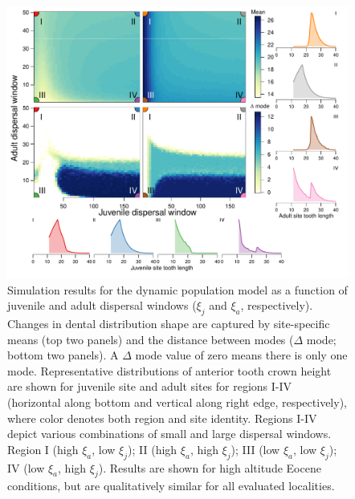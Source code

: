 \documentclass[]{rsos}%
\begin{document}
\begin{figure}[ht]
  \centering
  \includegraphics[width=1\linewidth]{fig_means_peaks_highlatitude_rev.pdf}  

\caption{Simulation results for the dynamic population model as a function of juvenile and adult dispersal windows ($\xi_j$ and $\xi_a$, respectively). 
Changes in dental distribution shape are captured by site-specific means (top two panels) and the distance between modes ($\Delta$ mode; bottom two panels).
A $\Delta$ mode value of zero means there is only one mode.
Representative distributions of anterior tooth crown height are shown for juvenile site and adult sites for regions I-IV  (horizontal along bottom and vertical along right edge, respectively), where color denotes both region and site identity.
Regions I-IV depict various combinations of small and large dispersal windows. Region I (high $\xi_a$, low $\xi_j$); II (high $\xi_a$, high $\xi_j$); III (low $\xi_a$, low $\xi_j$); IV (low $\xi_a$, high $\xi_j$).
Results are shown for high altitude Eocene conditions, but are qualitatively similar for all evaluated localities.
}
\label{fig:sim}
\end{figure}
\end{document}
